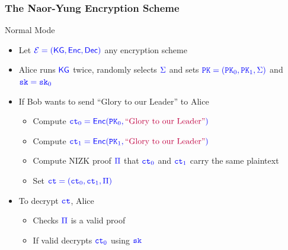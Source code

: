 \documentclass[]{beamer}
\newcommand{\calE}{\mathcal{E}}    %
\newcommand{\algofont}[1]{{\mathsf{#1}}}
\newcommand{\objfont}[1]{{\mathtt{#1}}}
\newcommand{\kg}{\algofont{KG}}
\newcommand{\enc}{\algofont{Enc}}
\newcommand{\dec}{\algofont{Dec}}
\newcommand{\ct}{\objfont{ct}}      %
\newcommand{\pk}{\objfont{PK}}      %
\newcommand{\sk}{\objfont{sk}}      %
\begin{document}
\begin{frame}
\frametitle{The Naor-Yung Encryption Scheme}
\begin{exampleblock}{Normal Mode}
\begin{itemize}
\item Let $\color{blue}\calE=(\kg,\enc,\dec)$ any encryption scheme
\item Alice runs $\color{blue} \kg$ twice, randomly selects $\color{blue} \Sigma$ 
and sets $\color{blue} \pk=(\pk_0,\pk_1,\Sigma)$ and $\color{blue} \sk=\sk_0$
\item If Bob wants to send {\color{purple} ``Glory to our Leader''} to Alice
    \begin{itemize}
    \item Compute $\color{blue} \ct_0=\enc(\pk_0,\text{\color{purple} ``Glory to our Leader''})$
    \item Compute $\color{blue} \ct_1=\enc(\pk_1,\text{\color{purple} ``Glory to our Leader''})$
    \item Compute NIZK proof $\color{blue} \Pi$ that $\color{blue} \ct_0$ and $\color{blue} \ct_1$ carry the same    
        plaintext
    \item Set $\color{blue} \ct=(\ct_0,\ct_1,\Pi)$
    \end{itemize}
\item To decrypt $\color{blue} \ct$, Alice
    \begin{itemize}
        \item Checks $\color{blue} \Pi$ is a valid proof
        \item If valid decrypts $\color{blue} \ct_0$ using $\color{blue} \sk$
    \end{itemize}
\end{itemize}
\end{exampleblock}
\end{frame}
\end{document}
